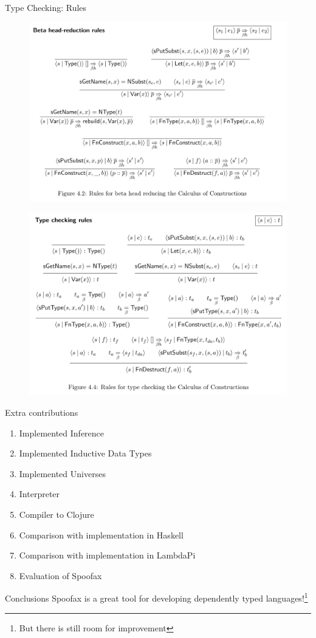 \documentclass[aspectratio=43]{beamer}
\begin{document}
\begin{frame}[fragile]{Type Checking: Rules}
	\begin{figure}
		\centering
		\includegraphics[width=0.5\linewidth]{img/screenshot001}
		\label{fig:screenshot001}
	\end{figure}
	\begin{figure}
		\centering
		\includegraphics[width=0.5\linewidth]{img/screenshot002}
		\label{fig:screenshot002}
	\end{figure}
	
\end{frame}

\begin{frame}[fragile]{Extra contributions}
\begin{enumerate}
	\item Implemented Inference
	\item Implemented Inductive Data Types
	\item Implemented Universes
	\item Interpreter
	\item Compiler to Clojure
	\item Comparison with implementation in Haskell
	\item Comparison with implementation in LambdaPi
	\item Evaluation of Spoofax
\end{enumerate}
\end{frame}

\begin{frame}[fragile]{Conclusions}
	Spoofax is a great tool for developing dependently typed languages!\footnote{But there is still room for improvement}
\end{frame}

\end{document}
